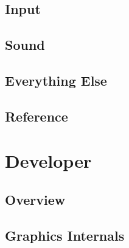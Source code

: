 \documentclass{book}
\begin{document}


\chapter{Input}
\label{chap:input}



\chapter{Sound}
\label{chap:sound}



\chapter{Everything Else}
\label{chap:everythingelse}



\chapter{Reference}
\label{chap:reference}



\part{Developer}
\label{part:developer}

\chapter{Overview}
\label{chap:devoverview}



\chapter{Graphics Internals}
\label{chap:gfxinternals}


\end{document}
